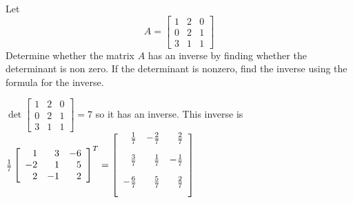 \documentclass{ximera}
\begin{document}
\begin{problem}\label{prb:7.27} Let
\begin{equation*}
A=
\left[
\begin{array}{rrr}
1 & 2 & 0 \\
0 & 2 & 1 \\
3 & 1 & 1
\end{array}
\right]
\end{equation*}
Determine whether the matrix $A$ has an inverse by finding whether the
determinant is non zero. If the determinant is nonzero, find the inverse
using the formula for the inverse.
\begin{hint}
$\det
\left[
\begin{array}{ccc}
1 & 2 & 0 \\
0 & 2 & 1 \\
3 & 1 & 1
\end{array}
\right] = 7$ so it has an inverse. This inverse is $\frac{1}{7}
\left[
\begin{array}{rrr}
1 & 3 & -6 \\
-2 & 1 & 5 \\
2 & -1 & 2
\end{array}
\right]^{T} = \left[
\begin{array}{rrr}
\vspace{0.05in}\frac{1}{7} & -\vspace{0.05in}\frac{2}{7} & \vspace{0.05in}\frac{2}{7} \\
\vspace{0.05in}\frac{3}{7} & \vspace{0.05in}\frac{1}{7} & -\vspace{0.05in}\frac{1}{7} \\
-\vspace{0.05in}\frac{6}{7} & \vspace{0.05in}\frac{5}{7} & \vspace{0.05in}\frac{2}{7}
\end{array}
\right] $
\end{hint}
\end{problem}
\end{document}
